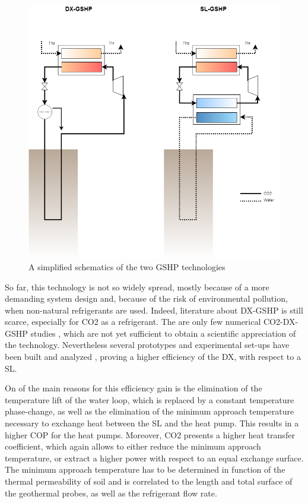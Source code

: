 \documentclass{article}
\begin{document}
\begin{figure}[h!]
\centering
\includegraphics[width=1\textwidth]{GSHP.png}
\caption{A simplified schematics of the two GSHP technologies}
\label{fig:gshp}
\end{figure}

So far, this technology is not so widely spread, mostly because of a more demanding system design and, because of the risk of environmental pollution, when non-natural refrigerants are used. Indeed, literature about DX-GSHP is still scarce, especially for CO2 as a refrigerant. The are only few numerical CO2-DX-GSHP studies \cite{eslami-nejadModelingTwophaseCO2filled2014a,ghazizade-ahsaeeEnergyExergyInvestigation2018,austinParametricStudyPerformance2011,eslami-nejadQuasitransientModelTranscritical2015}, which are not yet sufficient to obtain a scientific appreciation of the technology. Nevertheless several prototypes and experimental set-ups have been built and analyzed \cite{eslami-nejadDetailedTheoreticalCharacterization2018, badacheExperimentalStudyCarbon2018, guoTechnoeconomicComparisonDirect2012}, proving a higher efficiency of the DX, with respect to a SL.

On of the main reasons for this efficiency gain is the elimination of the temperature lift of the water loop, which is replaced by a constant temperature phase-change, as well as the elimination of the minimum approach temperature necessary to exchange heat between the SL and the heat pump. This results in a higher COP for the heat pumps. 
Moreover, CO2 presents a higher heat transfer coefficient, which again allows to either reduce the minimum approach temperature, or extract a higher power with respect to an equal exchange surface. The minimum approach temperature has to be determined in function of the thermal permeability of soil and is correlated to the length and total surface of the geothermal probes, as well as the refrigerant flow rate.
\end{document}
